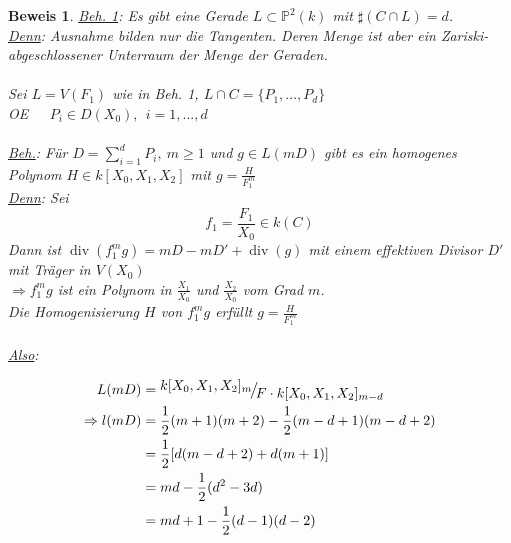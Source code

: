 \documentclass[a4paper,12pt]{report}
\theoremstyle{break}
\theoremstyle{nonumberbreak}
\theoremstyle{nonumberplain}
\newtheorem{Bew}{Beweis}
\newcommand{\FakRaum}[2]{
  \raisebox{0.7ex}{\ensuremath{#1}}
  \ensuremath{\mkern-3mu}\big/\ensuremath{\mkern-3mu}
  \raisebox{-0.6ex}{\ensuremath{#2}}}
\renewcommand{\OE}{O\!\!E~}
\begin{document}
\begin{Bew}
\underline{Beh. 1}: Es gibt eine Gerade $L\subset\mathbb{P}^2(k)$ mit $\sharp(C\cap L)=d$.\\
\underline{Denn}: Ausnahme bilden nur die Tangenten. Deren Menge ist aber ein Zariski-abgeschlossener Unterraum der Menge der Geraden.\\
\\
Sei $L=V(F_1)$ wie in Beh. 1, $L\cap C=\{P_1,...,P_d\}$\\
\OE~~$P_i\in D(X_0),~~i=1,...,d$\\
\\
\underline{Beh.}: Für $D=\sum_{i=1}^dP_i,~m\geq 1$ und $g\in L(mD)$ gibt es ein homogenes Polynom $H\in k[X_0,X_1,X_2]$ mit $g=\frac{H}{F_1^m}$\\
\underline{Denn}: Sei 
$$f_1=\frac{F_1}{X_0}\in k(C)$$
Dann ist $\operatorname{div}(f_1^mg)=mD-mD'+\operatorname{div}(g)$ mit einem effektiven Divisor $D'$
mit Träger in $V(X_0)$\\
$\Rightarrow f_1^mg$ ist ein Polynom in $\frac{X_1}{X_0}$ und $\frac{X_2}{X_0}$ vom Grad $m$.\\
Die Homogenisierung $H$ von $f_1^mg$ erfüllt $g=\frac{H}{F_1^m}$\\
\\
\underline{Also}: 

\begin{align*}
L(mD)&=\FakRaum{k[X_0,X_1,X_2]_m}{F\cdot k[X_0,X_1,X_2]_{m-d}}\\
\Rightarrow l(mD)&=\frac{1}{2}(m+1)(m+2)-\frac{1}{2}(m-d+1)(m-d+2)\\
&=\frac{1}{2}[d(m-d+2)+d(m+1)]\\
&=md-\frac{1}{2}(d^2-3d)\\
&=md+1-\frac{1}{2}(d-1)(d-2)
\end{align*}

\end{Bew}



\appendix

\def\indexspace{\par\medskip}
\end{document}
